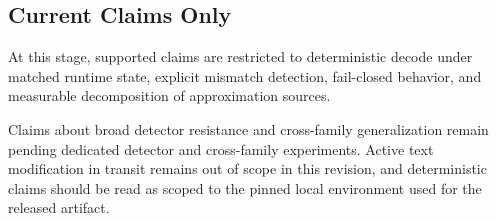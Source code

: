 \subsection{Current Claims Only}

At this stage, supported claims are restricted to deterministic decode under matched runtime state, explicit mismatch detection, fail-closed behavior, and measurable decomposition of approximation sources.

Claims about broad detector resistance and cross-family generalization remain pending dedicated detector and cross-family experiments. Active text modification in transit remains out of scope in this revision, and deterministic claims should be read as scoped to the pinned local environment used for the released artifact.
